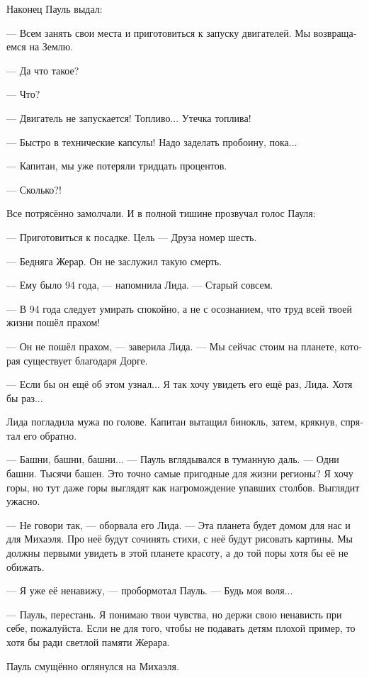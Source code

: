 \documentclass[a4paper,10pt,fleqn]{book}\usepackage{polyglossia}\setdefaultlanguage[babelshorthands=true]{russian}\setotherlanguage{english}\defaultfontfeatures{Ligatures=TeX,Mapping=tex-text}\usepackage{xcolor}\newcommand{\ml}[3]{#2}
\newcommand{\asterism}{\vspace{1em}{\centering\Large\bfseries$\ast~\ast~\ast$\par}\vspace{1em}}
\begin{document}
Наконец Пауль выдал:

--- Всем занять свои места и приготовиться к запуску двигателей.
Мы возвращаемся на Землю.

\asterism

--- Да что такое?

--- Что?

--- Двигатель не запускается!
Топливо...
Утечка топлива!

--- Быстро в технические капсулы!
Надо заделать пробоину, пока...

--- Капитан, мы уже потеряли тридцать процентов.

--- Сколько?!

Все потрясённо замолчали.
И в полной тишине прозвучал голос Пауля:

--- Приготовиться к посадке.
Цель --- Друза номер шесть.

\asterism

--- Бедняга Жерар.
Он не заслужил такую смерть.

--- Ему было 94 года, --- напомнила Лида.
--- Старый совсем.

--- В 94 года следует умирать спокойно, а не с осознанием, что труд всей твоей жизни пошёл прахом!

--- Он не пошёл прахом, --- заверила Лида.
--- Мы сейчас стоим на планете, которая существует благодаря Дорге.

--- Если бы он ещё об этом узнал...
Я так хочу увидеть его ещё раз, Лида.
Хотя бы раз...

Лида погладила мужа по голове.
Капитан вытащил бинокль, затем, крякнув, спрятал его обратно.

--- Башни, башни, башни... --- Пауль вглядывался в туманную даль.
--- Одни башни.
Тысячи башен.
Это точно самые пригодные для жизни регионы?
Я хочу горы, но тут даже горы выглядят как нагромождение упавших столбов.
Выглядит ужасно.

--- Не говори так, --- оборвала его Лида.
--- Эта планета будет домом для нас и для Михаэля.
Про неё будут сочинять стихи, с неё будут рисовать картины.
Мы должны первыми увидеть в этой планете красоту, а до той поры хотя бы её не обижать.

--- Я уже её ненавижу, --- пробормотал Пауль.
--- Будь моя воля...

--- Пауль, перестань.
Я понимаю твои чувства, но держи свою ненависть при себе, пожалуйста.
Если не для того, чтобы не подавать детям плохой пример, то хотя бы ради светлой памяти Жерара.

Пауль смущённо оглянулся на Михаэля.
\end{document}
